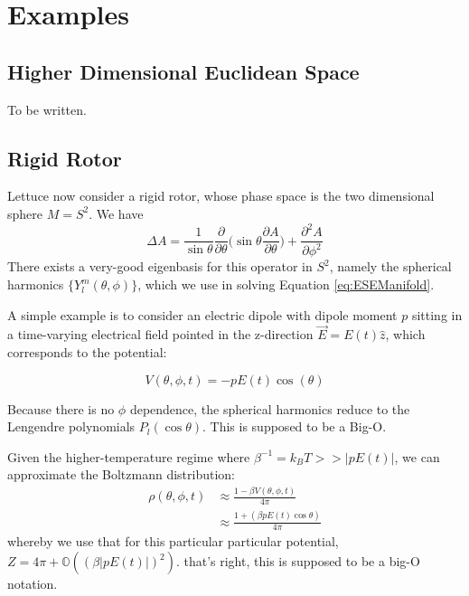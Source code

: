 \documentclass[%
 reprint,
 amsmath,amssymb,
 aps,
]{revtex4-2}
\begin{document}
\section{Examples}

\subsection{Higher Dimensional Euclidean Space}
To be written.

\subsection{Rigid Rotor}
Lettuce now consider a rigid rotor, whose phase space is the two dimensional sphere $M = S^2$. We have
\begin{equation}
    \Delta A = \frac{1}{\sin \theta} \frac{\partial}{\partial \theta} \bigg(\sin \theta \frac{\partial A}{\partial \theta} \bigg) + \frac{\partial^2 A}{\partial \phi^2}
\end{equation}
There exists a very-good eigenbasis for this operator in $S^2$, namely the spherical harmonics $\{Y_{l}^{m}(\theta, \phi) \}$, which we use in solving Equation \ref{eq:ESEManifold}.

A simple example is to consider an electric dipole with dipole moment $p$ sitting in a time-varying electrical field pointed in the z-direction $\vec{E} = E(t) \hat{z}$, which corresponds to the potential:

\begin{equation}
    V(\theta, \phi, t) = -p E(t) \cos (\theta)
\end{equation}

Because there is no $\phi$ dependence, the spherical harmonics reduce to the Lengendre polynomials $P_{l}(\cos \theta)$. This is supposed to be a Big-O.

Given the higher-temperature regime where $\beta^{-1} = k_{B} T >> |p E(t)|$, we can approximate the Boltzmann distribution:
\begin{align*}
    \rho(\theta, \phi, t) &\approx \frac{1 - \beta V(\theta, \phi, t)}{4 \pi} \\
    &\approx \frac{1 + (\beta p E(t) \cos\theta)}{4 \pi}
\end{align*}
whereby we use that for this particular particular potential, $Z = 4\pi + \mathbb{O}((\beta|p E(t)|)^2)$. that's right, this is supposed to be a big-O notation.
\end{document}
